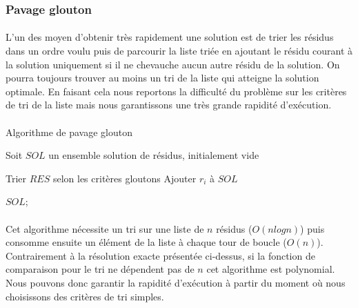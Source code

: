 \documentclass[12pt,french,twoside]{report}
\begin{document}
\subsubsection{Pavage glouton}

\label{TM_p}

\paragraph{}L'un des moyen d'obtenir très rapidement une solution est de trier les résidus dans un ordre voulu puis de parcourir la liste triée en ajoutant le résidu courant à la solution uniquement si il ne chevauche aucun autre résidu de la solution.
On pourra toujours trouver au moins un tri de la liste qui atteigne la solution optimale.
En faisant cela nous reportons la difficulté du problème sur les critères de tri de la liste mais nous garantissons une très grande rapidité d'exécution.

\paragraph{}
\begin{algorithm}[H]
  \caption{Algorithme de pavage glouton}
  Soit $SOL$ un ensemble solution de résidus, initialement vide\;
  
  Trier $RES$ selon les critères gloutons\;
   {
     {
      Ajouter $r_i$ à $SOL$\;
    }
  }
  
  \KwRet $SOL$;
\end{algorithm}

\paragraph{}Cet algorithme nécessite un tri sur une liste de $n$ résidus ($O(n log n)$) puis consomme ensuite un élément de la
liste à chaque tour de boucle ($O(n)$). Contrairement à la résolution exacte présentée ci-dessus, si la fonction de comparaison
pour le tri ne dépendent pas de $n$ cet algorithme est polynomial.
Nous pouvons donc garantir la rapidité d'exécution à partir du moment où nous choisissons des critères de tri simples.
\end{document}
